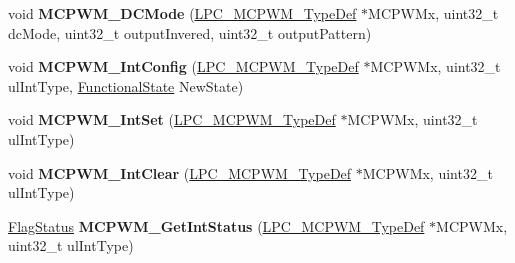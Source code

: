 \begin{DoxyCompactItemize}
\item 
\hypertarget{group___m_c_p_w_m___public___functions_gadbb94ec3f702478c59dab6ff0377223c}{void {\bfseries \-M\-C\-P\-W\-M\-\_\-\-D\-C\-Mode} (\hyperlink{struct_l_p_c___m_c_p_w_m___type_def}{\-L\-P\-C\-\_\-\-M\-C\-P\-W\-M\-\_\-\-Type\-Def} $\ast$\-M\-C\-P\-W\-Mx, uint32\-\_\-t dc\-Mode, uint32\-\_\-t output\-Invered, uint32\-\_\-t output\-Pattern)}\label{group___m_c_p_w_m___public___functions_gadbb94ec3f702478c59dab6ff0377223c}

\item 
\hypertarget{group___m_c_p_w_m___public___functions_ga89d04e5370dd87052d6ac6dbaffc186d}{void {\bfseries \-M\-C\-P\-W\-M\-\_\-\-Int\-Config} (\hyperlink{struct_l_p_c___m_c_p_w_m___type_def}{\-L\-P\-C\-\_\-\-M\-C\-P\-W\-M\-\_\-\-Type\-Def} $\ast$\-M\-C\-P\-W\-Mx, uint32\-\_\-t ul\-Int\-Type, \hyperlink{group___l_p_c___types___public___types_gac9a7e9a35d2513ec15c3b537aaa4fba1}{\-Functional\-State} \-New\-State)}\label{group___m_c_p_w_m___public___functions_ga89d04e5370dd87052d6ac6dbaffc186d}

\item 
\hypertarget{group___m_c_p_w_m___public___functions_gaaa883e7ce874a1711408008f954a8aae}{void {\bfseries \-M\-C\-P\-W\-M\-\_\-\-Int\-Set} (\hyperlink{struct_l_p_c___m_c_p_w_m___type_def}{\-L\-P\-C\-\_\-\-M\-C\-P\-W\-M\-\_\-\-Type\-Def} $\ast$\-M\-C\-P\-W\-Mx, uint32\-\_\-t ul\-Int\-Type)}\label{group___m_c_p_w_m___public___functions_gaaa883e7ce874a1711408008f954a8aae}

\item 
\hypertarget{group___m_c_p_w_m___public___functions_gaf36ff8cc2320ffacb800e8466f948754}{void {\bfseries \-M\-C\-P\-W\-M\-\_\-\-Int\-Clear} (\hyperlink{struct_l_p_c___m_c_p_w_m___type_def}{\-L\-P\-C\-\_\-\-M\-C\-P\-W\-M\-\_\-\-Type\-Def} $\ast$\-M\-C\-P\-W\-Mx, uint32\-\_\-t ul\-Int\-Type)}\label{group___m_c_p_w_m___public___functions_gaf36ff8cc2320ffacb800e8466f948754}

\item 
\hypertarget{group___m_c_p_w_m___public___functions_ga0fd65fbdf03d146a54955ce16a7c7420}{\hyperlink{group___l_p_c___types___public___types_ga89136caac2e14c55151f527ac02daaff}{\-Flag\-Status} {\bfseries \-M\-C\-P\-W\-M\-\_\-\-Get\-Int\-Status} (\hyperlink{struct_l_p_c___m_c_p_w_m___type_def}{\-L\-P\-C\-\_\-\-M\-C\-P\-W\-M\-\_\-\-Type\-Def} $\ast$\-M\-C\-P\-W\-Mx, uint32\-\_\-t ul\-Int\-Type)}\label{group___m_c_p_w_m___public___functions_ga0fd65fbdf03d146a54955ce16a7c7420}

\end{DoxyCompactItemize}
